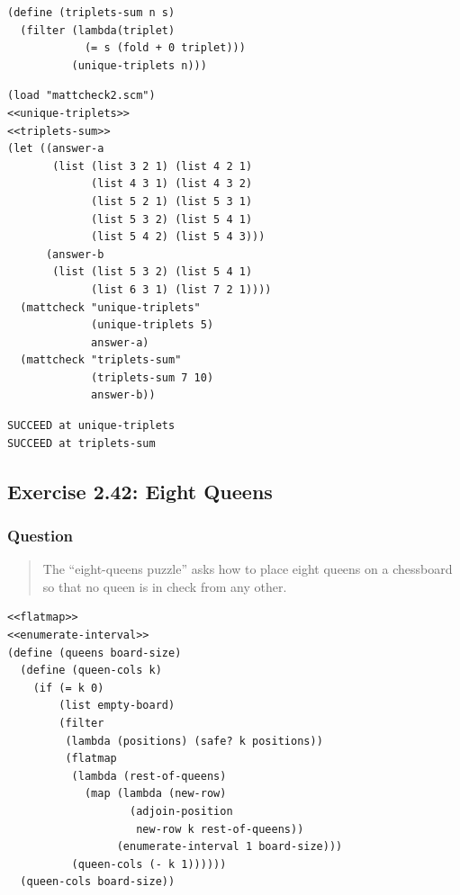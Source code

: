 \documentclass[final,fleqn,titlepage,twoside]{article}
\begin{document}
\begin{verbatim}
(define (triplets-sum n s)
  (filter (lambda(triplet)
            (= s (fold + 0 triplet)))
          (unique-triplets n)))
\end{verbatim}

\begin{verbatim}
(load "mattcheck2.scm")
<<unique-triplets>>
<<triplets-sum>>
(let ((answer-a
       (list (list 3 2 1) (list 4 2 1)
             (list 4 3 1) (list 4 3 2)
             (list 5 2 1) (list 5 3 1)
             (list 5 3 2) (list 5 4 1)
             (list 5 4 2) (list 5 4 3)))
      (answer-b
       (list (list 5 3 2) (list 5 4 1)
             (list 6 3 1) (list 7 2 1))))
  (mattcheck "unique-triplets"
             (unique-triplets 5)
             answer-a)
  (mattcheck "triplets-sum"
             (triplets-sum 7 10)
             answer-b))
\end{verbatim}

\begin{verbatim}
SUCCEED at unique-triplets
SUCCEED at triplets-sum
\end{verbatim}

\subsection{Exercise 2.42: Eight Queens}
\label{sec:org1578366}
\subsubsection{Question}
\label{sec:org660a9ea}
\begin{quote}
The ``eight-queens puzzle'' asks how to place eight queens on a chessboard so
that no queen is in check from any other.
\end{quote}

\begin{verbatim}
<<flatmap>>
<<enumerate-interval>>
(define (queens board-size)
  (define (queen-cols k)
    (if (= k 0)
        (list empty-board)
        (filter
         (lambda (positions) (safe? k positions))
         (flatmap
          (lambda (rest-of-queens)
            (map (lambda (new-row)
                   (adjoin-position
                    new-row k rest-of-queens))
                 (enumerate-interval 1 board-size)))
          (queen-cols (- k 1))))))
  (queen-cols board-size))
\end{verbatim}
\end{document}
